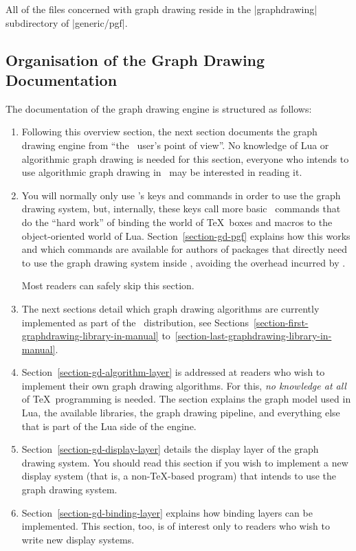 All of the files concerned with graph drawing reside in the
|graphdrawing| subdirectory of |generic/pgf|. 

\subsection{Organisation of the Graph Drawing Documentation}

The documentation of the graph drawing engine is structured as
follows:
\begin{enumerate}
\item Following this overview section, the next section documents
  the graph drawing engine from ``the \tikzname\ user's point of
  view''. No knowledge of Lua or algorithmic graph drawing is needed
  for this section, everyone who intends to use algorithmic graph
  drawing in \tikzname\ may be interested in reading it.
\item You will normally only use \tikzname's keys and
  commands in order to use the graph drawing system, but, internally,
  these keys call more basic \pgfname\ commands that do the ``hard
  work'' of binding the world of \TeX\ boxes and macros to the
  object-oriented world of Lua. Section~\ref{section-gd-pgf} explains
  how this works and which commands are available for authors of
  packages that directly need to use the graph drawing system inside
  \pgfname, avoiding the overhead incurred by \tikzname.

  Most readers can safely skip this section.
\item The next sections detail which graph drawing algorithms are
  currently implemented as part of the \tikzname\ distribution, see
  Sections~\ref{section-first-graphdrawing-library-in-manual}
  to~\ref{section-last-graphdrawing-library-in-manual}.
\item
  Section~\ref{section-gd-algorithm-layer} is addressed at readers
  who wish to implement their own graph drawing
  algorithms. For this, \emph{no knowledge at all} of \TeX\
  programming is needed. The section explains the graph model used in
  Lua, the available libraries, the graph drawing pipeline, and everything
  else that is part of the Lua side of the engine.
\item
  Section~\ref{section-gd-display-layer} details the
  display layer of the graph drawing system.  You should read this 
  section if you wish to implement a new display system (that is, a
  non-\TeX-based program) that intends to use the graph drawing system.
\item
  Section~\ref{section-gd-binding-layer} explains how binding layers
  can be implemented. This section, too, is of interest only to
  readers who wish to write new display systems. 
\end{enumerate}



